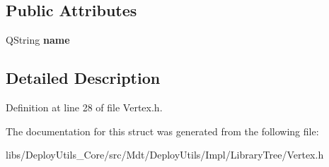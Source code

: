 \subsection*{Public Attributes}
\begin{DoxyCompactItemize}
\item 
Q\+String {\bfseries name}\hypertarget{struct_mdt_1_1_deploy_utils_1_1_impl_1_1_library_tree_1_1_vertex_data_aaa8ce71de60527689383e853f4e09cb1}{}\label{struct_mdt_1_1_deploy_utils_1_1_impl_1_1_library_tree_1_1_vertex_data_aaa8ce71de60527689383e853f4e09cb1}

\end{DoxyCompactItemize}


\subsection{Detailed Description}


Definition at line 28 of file Vertex.\+h.



The documentation for this struct was generated from the following file\+:\begin{DoxyCompactItemize}
\item 
libs/\+Deploy\+Utils\+\_\+\+Core/src/\+Mdt/\+Deploy\+Utils/\+Impl/\+Library\+Tree/Vertex.\+h\end{DoxyCompactItemize}
